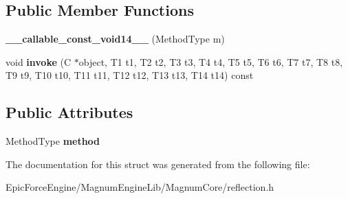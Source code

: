 \subsection*{Public Member Functions}
\begin{DoxyCompactItemize}
\item 
{\bfseries \+\_\+\+\_\+callable\+\_\+const\+\_\+void14\+\_\+\+\_\+} (Method\+Type m)\hypertarget{structagm_1_1reflection_1_1____callable__const__void14_____af7c698fbd1474e6085a6c3aa3e09bd8c}{}\label{structagm_1_1reflection_1_1____callable__const__void14_____af7c698fbd1474e6085a6c3aa3e09bd8c}

\item 
void {\bfseries invoke} (C $\ast$object, T1 t1, T2 t2, T3 t3, T4 t4, T5 t5, T6 t6, T7 t7, T8 t8, T9 t9, T10 t10, T11 t11, T12 t12, T13 t13, T14 t14) const \hypertarget{structagm_1_1reflection_1_1____callable__const__void14_____a2c9d9c866e2ad2ddbe32c427909e8ae5}{}\label{structagm_1_1reflection_1_1____callable__const__void14_____a2c9d9c866e2ad2ddbe32c427909e8ae5}

\end{DoxyCompactItemize}
\subsection*{Public Attributes}
\begin{DoxyCompactItemize}
\item 
Method\+Type {\bfseries method}\hypertarget{structagm_1_1reflection_1_1____callable__const__void14_____a89aff641ae9ea503af253f4eeeb3545d}{}\label{structagm_1_1reflection_1_1____callable__const__void14_____a89aff641ae9ea503af253f4eeeb3545d}

\end{DoxyCompactItemize}


The documentation for this struct was generated from the following file\+:\begin{DoxyCompactItemize}
\item 
Epic\+Force\+Engine/\+Magnum\+Engine\+Lib/\+Magnum\+Core/reflection.\+h\end{DoxyCompactItemize}
